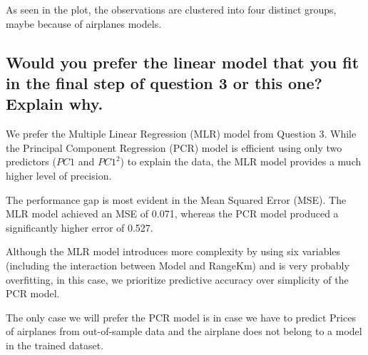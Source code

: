 As seen in the plot, the observations are clustered into four distinct groups, maybe because of airplanes models.

\subsection[Q4-c]{Would you prefer the linear model that you fit in the final step of question 3 or this one? Explain why.}

We prefer the Multiple Linear Regression (MLR) model from Question 3. While the Principal Component Regression (PCR) model is efficient using only two predictors ($PC1$ and $PC1^2$) to explain the data, the MLR model provides a much higher level of precision.

The performance gap is most evident in the Mean Squared Error (MSE). The MLR model achieved an MSE of 0.071, whereas the PCR model produced a significantly higher error of 0.527. 

Although the MLR model introduces more complexity by using six variables (including the interaction between Model and RangeKm) and is very probably overfitting, in this case, we prioritize predictive accuracy over simplicity of the PCR model.

The only case we will prefer the PCR model is in case we have to predict Prices of airplanes from out-of-sample data and the airplane does not belong to a model in the trained dataset.